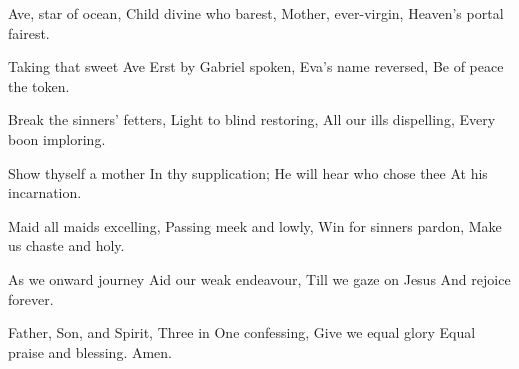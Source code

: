 Ave, star of ocean,
Child divine who barest,
Mother, ever-virgin,
Heaven's portal fairest.

Taking that sweet Ave
Erst by Gabriel spoken,
Eva's name reversed,
Be of peace the token.

Break the sinners' fetters,
Light to blind restoring,
All our ills dispelling,
Every boon imploring.

Show thyself a mother
In thy supplication;
He will hear who chose thee
At his incarnation.

Maid all maids excelling,
Passing meek and lowly,
Win for sinners pardon,
Make us chaste and holy.

As we onward journey
Aid our weak endeavour,
Till we gaze on Jesus
And rejoice forever.

Father, Son, and Spirit,
Three in One confessing,
Give we equal glory
Equal praise and blessing.
Amen.